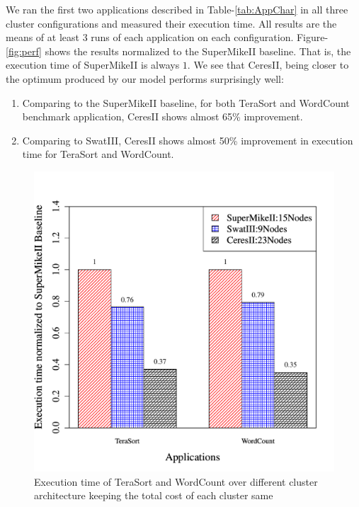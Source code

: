 \documentclass[journal]{IEEEtran}
\begin{document}
We ran the first two applications described in Table-\ref{tab:AppChar} in all three cluster configurations and measured their execution time. All results are the means of at least 3 runs of each application on each configuration. Figure-\ref{fig:perf} shows the results normalized to the SuperMikeII baseline. That is, the  execution time of SuperMikeII is always $1$. We see that CeresII, being closer to the optimum produced by our model performs surprisingly well: 
\begin{enumerate}
\item Comparing to the SuperMikeII baseline, for both TeraSort and WordCount benchmark application, CeresII shows almost 65\% improvement. 
\item Comparing to SwatIII, CeresII shows almost 50\% improvement in execution time for TeraSort and WordCount. 
\end{enumerate}
\begin{figure}[!t]
\centering
\includegraphics[width=.5\textwidth]{Figures/PerformanceFigures/execTimeTnW.pdf}
\caption{Execution time of TeraSort and WordCount over different cluster architecture keeping the total cost of each cluster same}
\end{figure}
\end{document}
